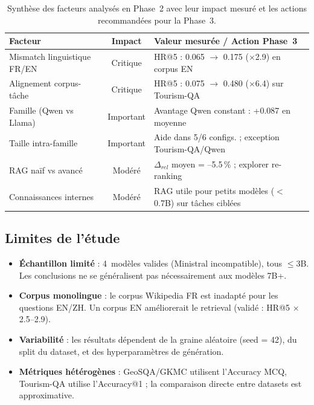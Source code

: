 \documentclass[12pt,a4paper]{article}
\begin{document}
\begin{table}[H]
\centering
\caption{Synth\`ese des facteurs analys\'es en Phase~2 avec leur impact mesur\'e
  et les actions recommand\'ees pour la Phase~3.}
\label{tab:facteurs_synthese}
\begin{tabularx}{\textwidth}{@{} l c X @{}}
\toprule
\textbf{Facteur} & \textbf{Impact} & \textbf{Valeur mesur\'ee / Action Phase~3} \\
\midrule
Mismatch linguistique FR/EN
  & \cellcolor{criticalred!20}Critique
  & HR@5 : 0.065 $\to$ 0.175 ($\times$2.9) en corpus EN \\
\rowcolor{lightgray}
Alignement corpus-t\^ache
  & \cellcolor{criticalred!20}Critique
  & HR@5 : 0.075 $\to$ 0.480 ($\times$6.4) sur Tourism-QA \\
Famille (Qwen vs Llama)
  & \cellcolor{importantyellow!30}Important
  & Avantage Qwen constant : +0.087 en moyenne \\
\rowcolor{lightgray}
Taille intra-famille
  & \cellcolor{importantyellow!30}Important
  & Aide dans 5/6 configs. ; exception Tourism-QA/Qwen \\
RAG na\"if vs avanc\'e
  & \cellcolor{importantyellow!30}Mod\'er\'e
  & $\Delta_{rel}$ moyen = --5.5\,\% ; explorer re-ranking \\
\rowcolor{lightgray}
Connaissances internes
  & \cellcolor{importantyellow!30}Mod\'er\'e
  & RAG utile pour petits mod\`eles ($<$0.7B) sur t\^aches cibl\'ees \\
\bottomrule
\end{tabularx}
\end{table}

\subsection{Limites de l'\'etude}

\begin{itemize}[leftmargin=*]
  \item \textbf{\'Echantillon limit\'e} : 4~mod\`eles valides (Ministral incompatible),
  tous $\leq$3B. Les conclusions ne se g\'en\'eralisent pas n\'ecessairement aux mod\`eles
  7B+.
  \item \textbf{Corpus monolingue} : le corpus Wikipedia FR est inadapt\'e pour les
  questions EN/ZH. Un corpus EN am\'eliorerait le retrieval (valid\'e : HR@5 $\times$2.5--2.9).
  \item \textbf{Variabilit\'e} : les r\'esultats d\'ependent de la graine al\'eatoire
  (seed = 42), du split du dataset, et des hyperparam\`etres de g\'en\'eration.
  \item \textbf{M\'etriques h\'et\'erog\`enes} : GeoSQA/GKMC utilisent l'Accuracy MCQ,
  Tourism-QA utilise l'Accuracy@1 ; la comparaison directe entre datasets est approximative.
\end{itemize}
\end{document}
